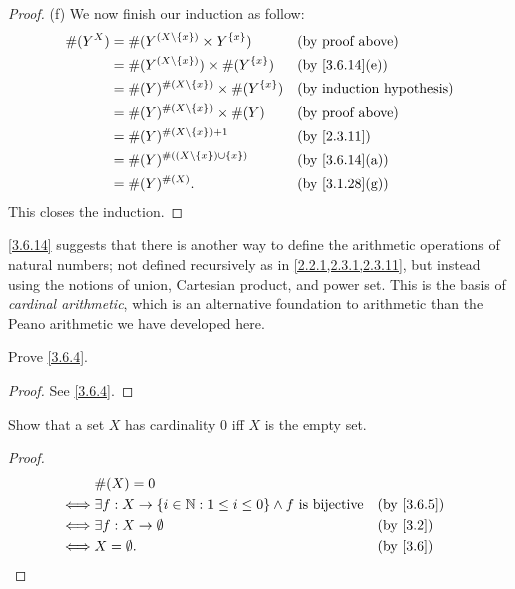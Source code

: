 \begin{proof}{(f)}
	We now finish our induction as follow:
	\begin{align*}
		\#(Y^X) & = \#(Y^{(X \setminus \set{x})} \times Y^{\set{x}})       &  & \text{(by proof above)}      \\
		        & = \#(Y^{(X \setminus \set{x})}) \times \#(Y^{\set{x}})   &  & \text{(by \cref{3.6.14}(e))} \\
		        & = \#(Y)^{\#(X \setminus \set{x})} \times \#(Y^{\set{x}}) &  & \byIH                        \\
		        & = \#(Y)^{\#(X \setminus \set{x})} \times \#(Y)           &  & \text{(by proof above)}      \\
		        & = \#(Y)^{\#(X \setminus \set{x}) + 1}                    &  & \by{2.3.11}                  \\
		        & = \#(Y)^{\#((X \setminus \set{x}) \cup \set{x})}         &  & \text{(by \cref{3.6.14}(a))} \\
		        & = \#(Y)^{\#(X)}.                                         &  & \text{(by \cref{3.1.28}(g))}
	\end{align*}
	This closes the induction.
\end{proof}

\begin{rmk}\label{3.6.15}
	\cref{3.6.14} suggests that there is another way to define the arithmetic operations of natural numbers;
	not defined recursively as in \cref{2.2.1,2.3.1,2.3.11}, but instead using the notions of union, Cartesian product, and power set.
	This is the basis of \emph{cardinal arithmetic}, which is an alternative foundation to arithmetic than the Peano arithmetic we have developed here.
\end{rmk}

\exercisesection

\begin{ex}\label{ex:3.6.1}
	Prove \cref{3.6.4}.
\end{ex}

\begin{proof}
	See \cref{3.6.4}.
\end{proof}

\begin{ex}\label{ex:3.6.2}
	Show that a set \(X\) has cardinality \(0\) iff \(X\) is the empty set.
\end{ex}

\begin{proof}
	\begin{align*}
		     & \#(X) = 0                                                                                       \\
		\iff & \exists f : X \to \set{i \in \N : 1 \leq i \leq 0} \land f \text{ is bijective} &  & \by{3.6.5} \\
		\iff & \exists f : X \to \emptyset                                                     &  & \by{3.2}   \\
		\iff & X = \emptyset.                                                                  &  & \by{3.6}
	\end{align*}
\end{proof}


